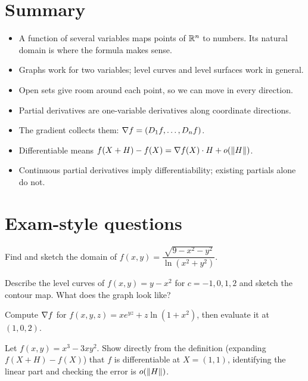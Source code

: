 \section{Summary}

\begin{keyidea}
\begin{itemize}
  \item A function of several variables maps points of $\mathbb{R}^n$ to numbers. Its natural
  domain is where the formula makes sense.
  \item Graphs work for two variables; level curves and level surfaces work in general.
  \item Open sets give room around each point, so we can move in every direction.
  \item Partial derivatives are one-variable derivatives along coordinate directions.
  \item The gradient collects them: $\nabla f=(D_1f,\dots,D_nf)$.
  \item Differentiable means $f(X+H)-f(X)=\nabla f(X)\cdot H+o(\left\lVert H\right\rVert)$.
  \item Continuous partial derivatives imply differentiability; existing partials alone do not.
\end{itemize}
\end{keyidea}

\section{Exam-style questions}

\begin{exercise}[1]
Find and sketch the domain of $f(x,y)=\dfrac{\sqrt{9-x^2-y^2}}{\ln(x^2+y^2)}$.
\end{exercise}

\begin{exercise}[1]
Describe the level curves of $f(x,y)=y-x^2$ for $c=-1,0,1,2$ and sketch the contour map.
What does the graph look like?
\end{exercise}

\begin{exercise}[1]
Compute $\nabla f$ for $f(x,y,z)=x e^{yz}+z\ln(1+x^2)$, then evaluate it at $(1,0,2)$.
\end{exercise}

\begin{exercise}[2]
Let $f(x,y)=x^3-3xy^2$. Show directly from the definition (expanding $f(X+H)-f(X)$) that $f$
is differentiable at $X=(1,1)$, identifying the linear part and checking the error is
$o(\left\lVert H\right\rVert)$.
\end{exercise}

